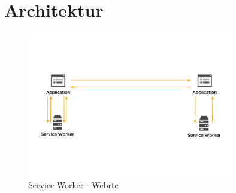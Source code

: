 \section{Architektur}
\begin{figure}[!h]
	\centering
	\includegraphics[width=0.8\textwidth]{figures/service_worker_app}
	\caption[A Figure Short-Title]{Service Worker - Webrtc}
	\label{fig:mesh}
\end{figure}

